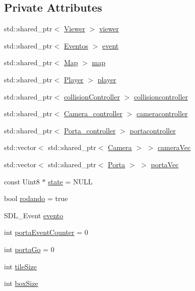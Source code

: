 \subsection*{Private Attributes}
\begin{DoxyCompactItemize}
\item 
std\+::shared\+\_\+ptr$<$ \hyperlink{classViewer}{Viewer} $>$ \hyperlink{classController_a9a290ffa5eeaf96a42daa9a68dc501ff}{viewer}
\item 
std\+::shared\+\_\+ptr$<$ \hyperlink{classEventos}{Eventos} $>$ \hyperlink{classController_a4f7ee884b34086ac959074caeb3b5107}{event}
\item 
std\+::shared\+\_\+ptr$<$ \hyperlink{classMap}{Map} $>$ \hyperlink{classController_a48cd1eac2b8cf98947433f580aa72feb}{map}
\item 
std\+::shared\+\_\+ptr$<$ \hyperlink{classPlayer}{Player} $>$ \hyperlink{classController_a96a143b0a60e1429c60f5fae58326bb6}{player}
\item 
std\+::shared\+\_\+ptr$<$ \hyperlink{classcollisionController}{collision\+Controller} $>$ \hyperlink{classController_a94db10a8bbfe6ad62d893cb4589d48d1}{collisioncontroller}
\item 
std\+::shared\+\_\+ptr$<$ \hyperlink{classCamera__controller}{Camera\+\_\+controller} $>$ \hyperlink{classController_a0fff98a80ea67c6c500d4f06f0d11995}{cameracontroller}
\item 
std\+::shared\+\_\+ptr$<$ \hyperlink{classPorta__controller}{Porta\+\_\+controller} $>$ \hyperlink{classController_a0dbb09739500259753bd2340d54e031c}{portacontroller}
\item 
std\+::vector$<$ std\+::shared\+\_\+ptr$<$ \hyperlink{classCamera}{Camera} $>$ $>$ \hyperlink{classController_a44b8398dc1a926b7528e32288b9bb7cd}{camera\+Vec}
\item 
std\+::vector$<$ std\+::shared\+\_\+ptr$<$ \hyperlink{classPorta}{Porta} $>$ $>$ \hyperlink{classController_ab386b5e19c31282f0471e011b65393ae}{porta\+Vec}
\item 
const Uint8 $\ast$ \hyperlink{classController_a4e2c7234de84518990f047e5e3d2f35e}{state} = N\+U\+LL
\item 
bool \hyperlink{classController_aafde74afadbef3109d8af8c324f6cc44}{rodando} = true
\item 
S\+D\+L\+\_\+\+Event \hyperlink{classController_aff78b97e8a07364fd11317c50fb98f88}{evento}
\item 
int \hyperlink{classController_ace9ec6683586dc71ad011b5b364b353e}{porta\+Event\+Counter} = 0
\item 
int \hyperlink{classController_aa4a9bf69dacf847c848e14838838f272}{porta\+Go} = 0
\item 
int \hyperlink{classController_a1f75badb13e3132e0f390a8838c33ad5}{tile\+Size}
\item 
int \hyperlink{classController_afdb6115d8bbca2eb32d253e66ee0b105}{box\+Size}
\end{DoxyCompactItemize}


